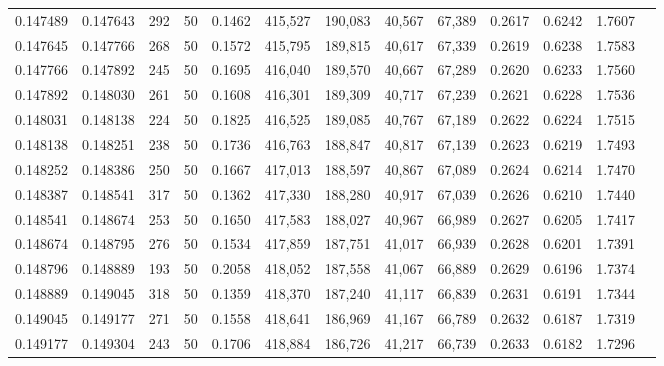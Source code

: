 \begin{tabular}{rrrrrrrrrrrrr}
0.147489 & 0.147643 &   292 &  50 &                                     0.1462 & 415,527 & 190,083 &  40,567 &  67,389 & 0.2617 & 0.6242 & 1.7607 \\
0.147645 & 0.147766 &   268 &  50 &                                     0.1572 & 415,795 & 189,815 &  40,617 &  67,339 & 0.2619 & 0.6238 & 1.7583 \\
0.147766 & 0.147892 &   245 &  50 &                                     0.1695 & 416,040 & 189,570 &  40,667 &  67,289 & 0.2620 & 0.6233 & 1.7560 \\
0.147892 & 0.148030 &   261 &  50 &                                     0.1608 & 416,301 & 189,309 &  40,717 &  67,239 & 0.2621 & 0.6228 & 1.7536 \\
0.148031 & 0.148138 &   224 &  50 &                                     0.1825 & 416,525 & 189,085 &  40,767 &  67,189 & 0.2622 & 0.6224 & 1.7515 \\
0.148138 & 0.148251 &   238 &  50 &                                     0.1736 & 416,763 & 188,847 &  40,817 &  67,139 & 0.2623 & 0.6219 & 1.7493 \\
0.148252 & 0.148386 &   250 &  50 &                                     0.1667 & 417,013 & 188,597 &  40,867 &  67,089 & 0.2624 & 0.6214 & 1.7470 \\
0.148387 & 0.148541 &   317 &  50 &                                     0.1362 & 417,330 & 188,280 &  40,917 &  67,039 & 0.2626 & 0.6210 & 1.7440 \\
0.148541 & 0.148674 &   253 &  50 &                                     0.1650 & 417,583 & 188,027 &  40,967 &  66,989 & 0.2627 & 0.6205 & 1.7417 \\
0.148674 & 0.148795 &   276 &  50 &                                     0.1534 & 417,859 & 187,751 &  41,017 &  66,939 & 0.2628 & 0.6201 & 1.7391 \\
0.148796 & 0.148889 &   193 &  50 &                                     0.2058 & 418,052 & 187,558 &  41,067 &  66,889 & 0.2629 & 0.6196 & 1.7374 \\
0.148889 & 0.149045 &   318 &  50 &                                     0.1359 & 418,370 & 187,240 &  41,117 &  66,839 & 0.2631 & 0.6191 & 1.7344 \\
0.149045 & 0.149177 &   271 &  50 &                                     0.1558 & 418,641 & 186,969 &  41,167 &  66,789 & 0.2632 & 0.6187 & 1.7319 \\
0.149177 & 0.149304 &   243 &  50 &                                     0.1706 & 418,884 & 186,726 &  41,217 &  66,739 & 0.2633 & 0.6182 & 1.7296 \\

\end{tabular}

